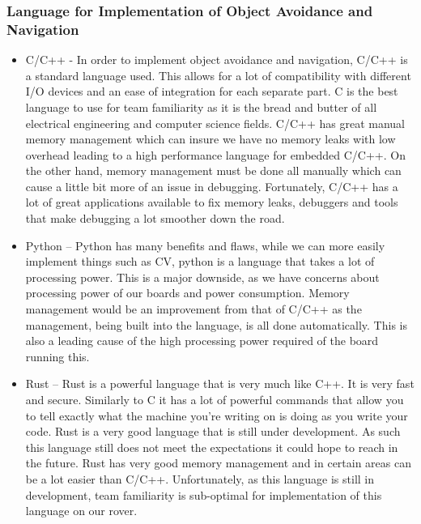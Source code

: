 \documentclass[onecolumn, draftclsnofoot, 10pt, compsoc]{IEEEtran}
\begin{document}
\subsubsection{Language for Implementation of Object Avoidance and Navigation}
\begin{itemize}
	\item C/C++ - In order to implement object avoidance and navigation, C/C++ is a standard language used. This allows for a lot of compatibility with different I/O devices and an ease of integration for each separate part. C is the best language to use for team familiarity as it is the bread and butter of all electrical engineering and computer science fields. C/C++ has great manual memory management which can insure we have no memory leaks with low overhead leading to a high performance language for embedded C/C++. On the other hand, memory management must be done all manually which can cause a little bit more of an issue in debugging. Fortunately, C/C++ has a lot of great applications available to fix memory leaks, debuggers and tools that make debugging a lot smoother down the road. 
	\item  Python – Python has many benefits and flaws, while we can more easily implement things such as CV, python is a language that takes a lot of processing power. This is a major downside, as we have concerns about processing power of our boards and power consumption. Memory management would be an improvement from that of C/C++ as the management, being built into the language, is all done automatically. This is also a leading cause of the high processing power required of the board running this. 
	\item Rust – Rust is a powerful language that is very much like C++. It is very fast and secure. Similarly to C it has a lot of powerful commands that allow you to tell exactly what the machine you’re writing on is doing as you write your code. Rust is a very good language that is still under development. As such this language still does not meet the expectations it could hope to reach in the future. Rust has very good memory management and in certain areas can be a lot easier than C/C++. Unfortunately, as this language is still in development, team familiarity is sub-optimal for implementation of this language on our rover. 
\end{itemize}
\end{document}
